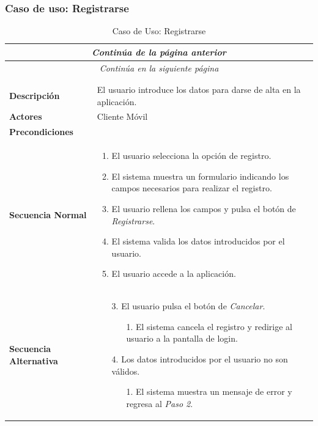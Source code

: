 \newpage
\subsubsection*{Caso de uso: Registrarse}
\begin{longtable}{| p{4cm} | p{10cm} |}
\endfirsthead
\multicolumn{2}{c}{\textit{Continúa de la página anterior}}\\[12pt]
\hline
\endhead
\hline
\multicolumn{2}{c}{\textit{Continúa en la siguiente página}} \\
\endfoot
\hline
\caption{Caso de Uso: Registrarse}\label{fig:1}\\
\endlastfoot


\hline
\multicolumn{2}{|c|}{\textbf{CU$<$02$>$ - Registrarse}} \\

\hline
\textbf{Descripción} &
El usuario introduce los datos para darse de alta en la aplicación. \\

\hline
\textbf{Actores} &
Cliente Móvil\\


\hline
\textbf{Precondiciones} &
\\

\hline
\textbf{Secuencia Normal} &\mbox{}\par\vspace{-\baselineskip}
\begin{enumerate}[leftmargin=0.7cm, topsep=0.1cm]
\item El usuario selecciona la opción de registro.
\item El sistema muestra un formulario indicando los campos necesarios para realizar el registro.
\item El usuario rellena los campos y pulsa el botón de \textit{Registrarse}.
\item El sistema valida los datos introducidos por el usuario.
\item El usuario accede a la aplicación.
\end{enumerate}\\

\hline
\textbf{Secuencia Alternativa} &\mbox{}\par\vspace{-\baselineskip}
\begin{enumerate}[leftmargin=0.9cm, topsep=0.1cm]
\item[3.] El usuario pulsa el botón de \textit{Cancelar}.
	\begin{itemize}
	\item[1.] El sistema cancela el registro y redirige al usuario a la pantalla de login.
	\end{itemize}
\item[4.] Los datos introducidos por el usuario no son válidos.
	\begin{itemize}
	\item[1.] El sistema muestra un mensaje de error y regresa al \textit{Paso 2}.
	\end{itemize}
\end{enumerate}\\


\end{longtable}
